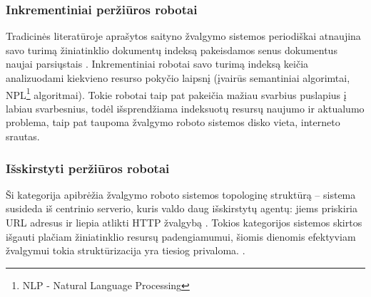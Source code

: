 \subsubsection{Inkrementiniai peržiūros robotai}

Tradicinės literatūroje aprašytos saityno žvalgymo sistemos periodiškai atnaujina savo turimą žiniatinklio dokumentų indeksą pakeisdamos senus dokumentus naujai parsiųstais \cite{CategoriesOfWebCrawlersAndOverview}. Inkrementiniai robotai savo turimą indeksą keičia analizuodami kiekvieno resurso pokyčio laipsnį (įvairūs semantiniai algorimtai, NPL\footnote{NLP - Natural Language Processing} algoritmai). Tokie robotai taip pat pakeičia mažiau svarbius puslapius į labiau svarbesnius, todėl išsprendžiama indeksuotų resursų naujumo ir aktualumo problema, taip pat taupoma žvalgymo roboto sistemos disko vieta, interneto srautas.

\subsubsection{Išskirstyti peržiūros robotai}

Ši kategorija apibrėžia žvalgymo roboto sistemos topologinę struktūrą -- sistema susideda iš centrinio serverio, kuris valdo daug išskirstytų agentų: jiems priskiria URL adresus ir liepia atlikti HTTP žvalgybą \cite{CategoriesOfWebCrawlersAndOverview}. Tokios kategorijos sistemos skirtos išgauti plačiam žiniatinklio resursų padengiamumui, šiomis dienomis efektyviam žvalgymui tokia struktūrizacija yra tiesiog privaloma. \cite{CategoriesOfWebCrawlersAndOverview}.